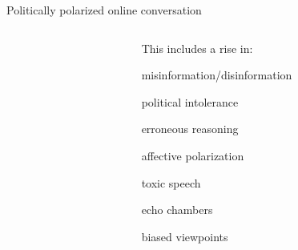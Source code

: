 \documentclass[12pt]{beamer}
\begin{document}
\begin{frame}[c]{Politically polarized online conversation}
\begin{columns}[c,onlytextwidth]
  \begin{column}{0.01\textwidth}\hfill\end{column}
  \begin{column}{0.5\textwidth}
  This includes a rise in:\\
    \RaggedRight
    \begin{compactitem}
        \item misinformation/disinformation
        \item political intolerance
        \item erroneous reasoning
        \item affective polarization
        \item toxic speech
        \item echo chambers
        \item biased viewpoints
    \end{compactitem}
  \end{column}


\end{columns}
\end{frame}
\end{document}
